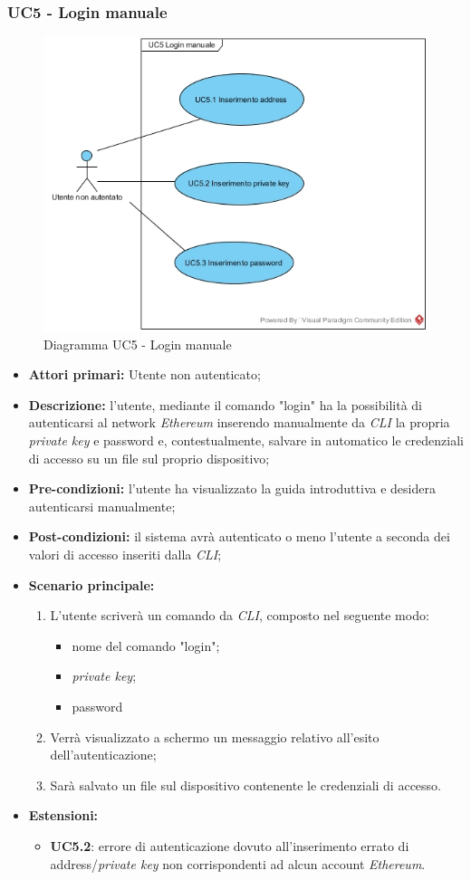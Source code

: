 \subsubsection{UC5 - Login manuale}
\begin{figure}[h]
	\centering
	\includegraphics[width=0.8\linewidth]{res/img/UC5.jpg}
	\caption{Diagramma UC5 - Login manuale}
\end{figure}
\begin{itemize}
	\item \textbf{Attori primari:} Utente non autenticato;
	\item \textbf{Descrizione:} l'utente, mediante il comando "login" ha la possibilità di autenticarsi al network \textit{Ethereum\glo} inserendo manualmente da \textit{CLI\glo} la propria \textit{private key\glos} e password e, contestualmente, salvare in automatico le credenziali di accesso su un file sul proprio dispositivo;
	\item \textbf{Pre-condizioni:} l'utente ha visualizzato la guida introduttiva e desidera autenticarsi manualmente;
	\item \textbf{Post-condizioni:} il sistema avrà autenticato o meno l'utente a seconda dei valori di accesso inseriti dalla \textit{CLI\glos};
	\item \textbf{Scenario principale:}
	\begin{enumerate}
		\item L'utente scriverà un comando da \textit{CLI\glos}, composto nel seguente modo:
		\begin{itemize}
			\item nome del comando "login";
			\item \textit{private key\glos};
			\item password
		\end{itemize}
		\item Verrà visualizzato a schermo un messaggio relativo all'esito dell'autenticazione;
		\item Sarà salvato un file sul dispositivo contenente le credenziali di accesso.
	\end{enumerate}
	\item \textbf{Estensioni:} 
	\begin{itemize}
		\item \textbf{UC5.2}: errore di autenticazione dovuto all'inserimento errato di address/\textit{private key\glos} non corrispondenti ad alcun account \textit{Ethereum\glos}.
	\end{itemize}
\end{itemize}
